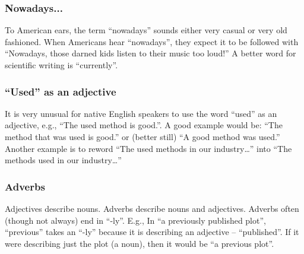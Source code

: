 \documentclass{article}
\begin{document}
\subsubsection{Nowadays...}
To American ears, the term “nowadays” sounds either very casual or very old fashioned. When Americans hear “nowadays”, they expect it to be followed with “Nowadays, those darned kids listen to their music too loud!” A better word for scientific writing is “currently”.

\subsubsection{“Used” as an adjective}
It is very unusual for native English speakers to use the word “used” as an adjective, e.g., “The used method is good.”. A good example would be: “The method that was used is good.” or (better still) “A good method was used.” Another example is to reword “The used methods in our industry…” into “The methods used in our industry…”

\subsubsection{Adverbs}
Adjectives describe nouns. Adverbs describe nouns and adjectives. Adverbs often (though not always) end in “-ly”. E.g., In “a previously published plot”, “previous” takes an “-ly” because it is describing an adjective – “published”. If it were describing just the plot (a noun), then it would be “a previous plot”.
\end{document}
